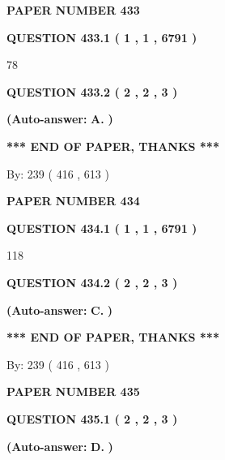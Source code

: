 \documentclass{ctexart}
\begin{document}
   
\newpage 
\setcounter{page}{ 
   433001 } 
   
   
 {\textbf{ \Large{ PAPER NUMBER  433  }}}
   
   
   
   
  
  
{\textbf{\large{QUESTION
433.1 
 ( 1 , 1 , 6791 )
}}}

78
  
  
{\textbf{\large{QUESTION
433.2 
 ( 2 , 2 , 3 )
}}}
 
 
{\textbf{(Auto-answer:}}
{\textbf{\large{
A.}}}
{\textbf{)}}
 
 
   
   
   
   
\vspace{1.0in} 
{\textbf{\large{ *** END OF PAPER, THANKS *** }}} 
   
   
\hspace{1.0in} By: 
 239 ( 416 ,  613 )
   
   
   
   
\newpage 
\setcounter{page}{ 
   434001 } 
   
   
 {\textbf{ \Large{ PAPER NUMBER  434  }}}
   
   
   
   
  
  
{\textbf{\large{QUESTION
434.1 
 ( 1 , 1 , 6791 )
}}}

118
  
  
{\textbf{\large{QUESTION
434.2 
 ( 2 , 2 , 3 )
}}}
 
 
{\textbf{(Auto-answer:}}
{\textbf{\large{
C.}}}
{\textbf{)}}
 
 
   
   
   
   
\vspace{1.0in} 
{\textbf{\large{ *** END OF PAPER, THANKS *** }}} 
   
   
\hspace{1.0in} By: 
 239 ( 416 ,  613 )
   
   
   
   
\newpage 
\setcounter{page}{ 
   435001 } 
   
   
 {\textbf{ \Large{ PAPER NUMBER  435  }}}
   
   
   
   
  
  
{\textbf{\large{QUESTION
435.1 
 ( 2 , 2 , 3 )
}}}
 
 
{\textbf{(Auto-answer:}}
{\textbf{\large{
D.}}}
{\textbf{)}}
 
 
  
\end{document}
